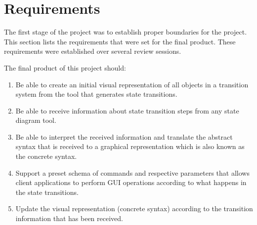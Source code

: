 \documentclass[11pt,a4paper]{article}
\begin{document}
\section{Requirements}

The first stage of the project was to establish proper boundaries for the project. This section lists the requirements that were set for the final product. These requirements were established over several review sessions.	

The final product of this project should:

\begin{enumerate}
	\item Be able to create an initial visual representation of all objects in a transition system from the tool that generates state transitions.
	\item Be able to receive information about state transition steps from any state diagram tool.
	\item Be able to interpret the received information and translate the abstract syntax that is received to a graphical representation which is also known as the concrete syntax.
	\item Support a preset schema of commands and respective parameters that allows client applications to perform GUI operations according to what happens in the state transitions.
	\item Update the visual representation (concrete syntax) according to the transition information that has been received.
\end{enumerate}


\end{document}
